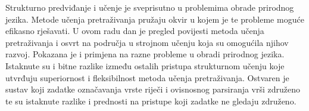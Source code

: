 \begin{sazetak}
Strukturno predviđanje i učenje je sveprisutno u problemima obrade prirodnog
jezika. Metode učenja pretraživanja pružaju okvir u kojem je te probleme moguće
efikasno rješavati. U ovom radu dan je pregled povijesti metoda učenja
pretraživanja i osvrt na područja u strojnom učenju koja su omogućila njihov
razvoj. Pokazana je i primjena na razne probleme u obradi prirodnog jezika.
Istaknute su i bitne razlike između ostalih pristupa strukturnom učenju koje
utvrđuju superiornost i fleksibilnost metoda učenja pretraživanja. Ostvaren je
sustav koji zadatke označavanja vrste riječi i ovisnosnog parsiranja vrši
združeno te su istaknute razlike i prednosti na pristupe koji zadatke ne gledaju
združeno.

\end{sazetak}
